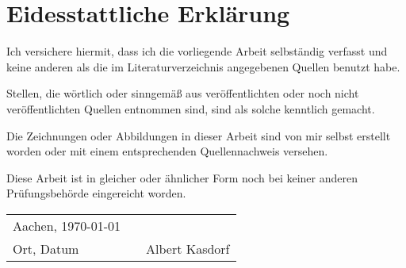 %
%

\chapter*{Eidesstattliche Erklärung}

\thispagestyle{empty}


Ich versichere hiermit, dass ich die vorliegende Arbeit selbständig verfasst und keine anderen als die im Literaturverzeichnis angegebenen Quellen benutzt habe.

Stellen, die wörtlich oder sinngemäß aus veröffentlichten oder noch nicht veröffentlichten Quellen entnommen sind, sind als solche kenntlich gemacht.

Die Zeichnungen oder Abbildungen in dieser Arbeit sind von mir selbst erstellt worden oder mit einem entsprechenden Quellennachweis versehen.

Diese Arbeit ist in gleicher oder ähnlicher Form noch bei keiner anderen Prüfungsbehörde eingereicht worden.

\vspace{1cm}

\begin{center}
\begin{tabular}[h]{lp{2cm}p{5.5cm}}
Aachen, \today & & \\
\cline{1-1}\cline{3-3}
Ort, Datum& & Albert Kasdorf\\
\end{tabular}
\end{center}